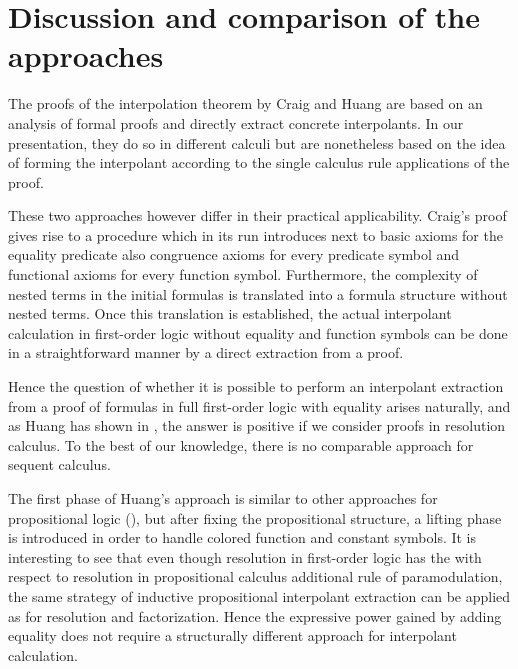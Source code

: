 \section{Discussion and comparison of the approaches}

The proofs of the interpolation theorem by Craig and Huang are based on an analysis of formal proofs and directly extract concrete interpolants.
In our presentation, they do so in different calculi but are nonetheless based on the idea of forming the interpolant according to the single calculus rule applications of the proof.

These two approaches however differ in their practical applicability. 
Craig's proof gives rise to a procedure which in its run introduces next to basic axioms for the equality predicate also congruence axioms for every predicate symbol and functional axioms for every function symbol.
Furthermore, the complexity of nested terms in the initial formulas is translated into a formula structure without nested terms.
Once this translation is established, the actual interpolant calculation in first-order logic without equality and function symbols can be done in a straightforward manner by a direct extraction from a proof.

Hence the question of whether it is possible to perform an interpolant extraction from a proof of formulas in full first-order logic with equality arises naturally, and as Huang has shown in \cite{Huang95}, the answer is positive if we consider proofs in resolution calculus.
To the best of our knowledge, there is no comparable approach for sequent calculus.

The first phase of Huang's approach is similar to other approaches for propositional logic (\cite{krajivcek1997interpolation,Pudlak97,McMillan03}),
but after fixing the propositional structure, a lifting phase is introduced in order to handle colored function and constant symbols.
It is interesting to see that even though resolution in first-order logic has the with respect to resolution in propositional calculus additional rule of paramodulation, the same strategy of inductive propositional interpolant extraction can be applied as for resolution and factorization.
Hence the expressive power gained by adding equality does not require a structurally different approach for interpolant calculation.



